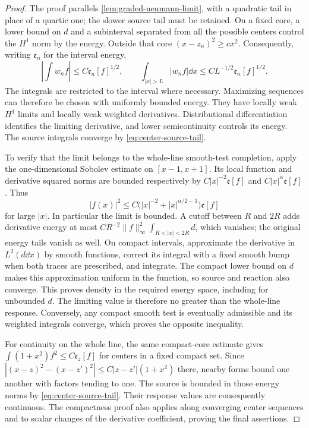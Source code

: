 \begin{proof}
The proof parallels \cref{lem:graded-neumann-limit}, with a quadratic
tail in place of a quartic one; the slower source tail must be
retained. On a fixed core, a lower bound on $d$ and a subinterval
separated from all the possible centers control the $H^1$ norm by
the energy. Outside that core $(x-z_n)^2\ge c x^2$. Consequently,
writing $\mathfrak e_n$ for the interval energy,
\begin{equation}\label{eq:center-source-tail}
 \left|\int w_nf\right|\le C\mathfrak e_n[f]^{1/2},\qquad
 \int_{|x|>L}|w_nf|\dd x
                 \le CL^{-1/2}\mathfrak e_n[f]^{1/2}.
\end{equation}
The integrals are restricted to the interval where necessary.
Maximizing sequences can therefore be chosen with uniformly
bounded energy. They have locally weak $H^1$ limits and locally
weak weighted derivatives. Distributional differentiation
identifies the limiting derivative, and lower semicontinuity
controls its energy. The source integrals converge by
\eqref{eq:center-source-tail}.

To verify that the limit belongs to the whole-line smooth-test
completion, apply the one-dimensional Sobolev estimate on
$[x-1,x+1]$. Its local function and derivative squared norms are
bounded respectively by $C|x|^{-2}\mathfrak e[f]$ and
$C|x|^\alpha\mathfrak e[f]$. Thus
\begin{equation}\label{eq:center-point-bound}
 |f(x)|^2\le C\bigl(|x|^{-2}+|x|^{\alpha/2-1}\bigr)
                                \mathfrak e[f]
\end{equation}
for large $|x|$. In particular the limit is bounded. A cutoff
between $R$ and $2R$ adds derivative energy at most
$CR^{-2}\|f\|_\infty^2\int_{R<|x|<2R}d$, which vanishes; the
original energy tails vanish as well. On compact intervals,
approximate the derivative in $L^2(d\dd x)$ by smooth functions,
correct its integral with a fixed smooth bump when both traces
are prescribed, and integrate. The compact lower bound on $d$
makes this approximation uniform in the function, so source and
reaction also converge. This proves density in the required
energy space, including for unbounded $d$. The limiting value is
therefore no greater than the whole-line response. Conversely,
any compact smooth test is eventually admissible and its weighted
integrals converge, which proves the opposite inequality.

For continuity on the whole line, the same compact-core estimate
gives $\int(1+x^2)f^2\le C\mathfrak e_z[f]$ for centers in a
fixed compact set. Since
$|(x-z)^2-(x-z')^2|\le C|z-z'|(1+x^2)$ there, nearby forms
bound one another with factors tending to one. The source is
bounded in those energy norms by \eqref{eq:center-source-tail}.
Their response values are consequently continuous. The compactness
proof also applies along converging center sequences and to
scalar changes of the derivative coefficient, proving the final
assertions.
\end{proof}

